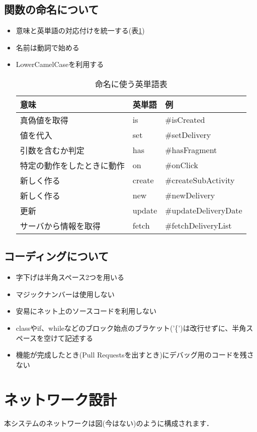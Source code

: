 \documentclass[a4j,titlepage]{jarticle}
\begin{document}
\subsection{関数の命名について}
\begin{itemize}
\item 意味と英単語の対応付けを統一する(表\ref{namingTable})
\item 名前は動詞で始める
\item LowerCamelCaseを利用する
\begin{table}[htb]
\centering
\caption{命名に使う英単語表}
\label{namingTable}
\begin{tabular}{|lll|}
\hline
意味            & 英単語    & 例                    \\ \hline
真偽値を取得        & is     & \#isCreated          \\
値を代入          & set    & \#setDelivery        \\
引数を含むか判定      & has    & \#hasFragment        \\
特定の動作をしたときに動作 & on     & \#onClick            \\
新しく作る         & create & \#createSubActivity  \\
新しく作る         & new    & \#newDelivery        \\
更新            & update & \#updateDeliveryDate \\
サーバから情報を取得    & fetch  & \#fetchDeliveryList  \\ \hline
\end{tabular}
\end{table}
\end{itemize}

\subsection{コーディングについて}
\begin{itemize}
\item 字下げは半角スペース2つを用いる
\item マジックナンバーは使用しない
\item 安易にネット上のソースコードを利用しない
\item classやif、whileなどのブロック始点のブラケット('\{')は改行せずに、半角スペースを空けて記述する
\item 機能が完成したとき(Pull Requestsを出すとき)にデバッグ用のコードを残さない
\end{itemize}


\section{ネットワーク設計}
本システムのネットワークは図(今はない)のように構成されます．
\end{document}
